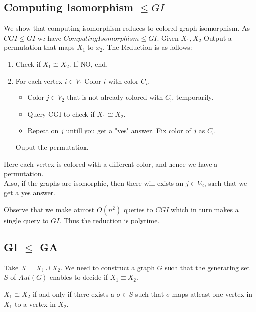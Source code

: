 \subsection{Computing Isomorphism $\le GI$}
We show that computing isomorphism reduces to colored graph isomorphism. As $CGI\leq GI$ we have $Computing Isomorphism \le GI$.  Given $X_1,X_2$ Output a permutation that maps $X_1$ to $x_2$.
The Reduction is as follows:
\begin{enumerate}
\item Check if $X_1 \cong X_2$. If NO, end.
\item For each vertex $i \in V_1$ 
	Color $i$ with color $C_i$.
	\begin{itemize}
	\item Color $j \in V_2$ that is not already colored with $C_i$, temporarily.
	\item Query CGI to check if $X_1\cong X_2$.
	\item Repeat on $j$ untill you get a "yes" answer. Fix color of $j$ as $C_i$.
	\end{itemize}
Ouput the permutation.
\end{enumerate}
Here each vertex is colored with a different color, and hence we have a permutation.\\
Also, if the graphs are isomorphic, then there will exists an $j \in V_2$, such that we get a yes answer.

Observe that we make atmost $O(n^2)$ queries to $CGI$ which in turn makes a single query to $GI$. Thus the reduction is polytime.


\subsection{GI $\le$ GA}
Take $X = X_1 \cup X_2$. We need to construct a graph $G$ such that the generating set $S$ of $Aut(G)$ enables to decide if $X_1\equiv X_2$.

\begin{claim}
$X_1 \cong X_2$ if and only if there exists a $\sigma \in S$ such that $\sigma$ maps atleast one vertex in $X_1$ to a vertex in $X_2$.
\end{claim}

